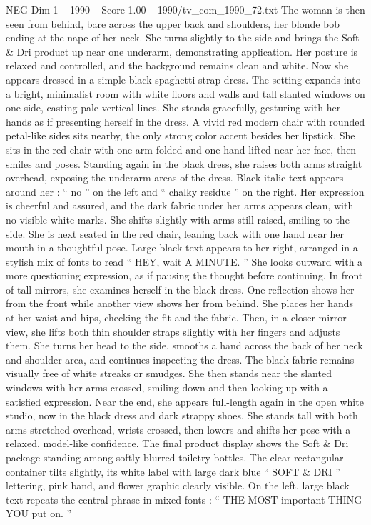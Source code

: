 \begin{textsample}{NEG Dim 1 – 1990 – Score 1.00 – 1990/tv\_com\_1990\_72.txt}
The woman is then seen from behind, bare across the upper back and shoulders, her blonde bob ending at the nape of her neck.
She turns slightly to the side and brings the Soft \& Dri product up near one underarm, demonstrating application.
Her posture is relaxed and controlled, and the background remains clean and white.
Now she appears dressed in a simple black spaghetti-strap dress.
The setting expands into a bright, minimalist room with white floors and walls and tall slanted windows on one side, casting pale vertical lines.
She stands gracefully, gesturing with her hands as if presenting herself in the dress.
A vivid red modern chair with rounded petal-like sides sits nearby, the only strong color accent besides her lipstick.
She sits in the red chair with one arm folded and one hand lifted near her face, then smiles and poses.
Standing again in the black dress, she raises both arms straight overhead, exposing the underarm areas of the dress.
Black italic text appears around her : “ no ” on the left and “ chalky residue ” on the right.
Her expression is cheerful and assured, and the dark fabric under her arms appears clean, with no visible white marks.
She shifts slightly with arms still raised, smiling to the side.
She is next seated in the red chair, leaning back with one hand near her mouth in a thoughtful pose.
Large black text appears to her right, arranged in a stylish mix of fonts to read “ HEY, wait A MINUTE. ” She looks outward with a more questioning expression, as if pausing the thought before continuing.
In front of tall mirrors, she examines herself in the black dress.
One reflection shows her from the front while another view shows her from behind.
She places her hands at her waist and hips, checking the fit and the fabric.
Then, in a closer mirror view, she lifts both thin shoulder straps slightly with her fingers and adjusts them.
She turns her head to the side, smooths a hand across the back of her neck and shoulder area, and continues inspecting the dress.
The black fabric remains visually free of white streaks or smudges.
She then stands near the slanted windows with her arms crossed, smiling down and then looking up with a satisfied expression.
Near the end, she appears full-length again in the open white studio, now in the black dress and dark strappy shoes.
She stands tall with both arms stretched overhead, wrists crossed, then lowers and shifts her pose with a relaxed, model-like confidence.
The final product display shows the Soft \& Dri package standing among softly blurred toiletry bottles.
The clear rectangular container tilts slightly, its white label with large dark blue “ SOFT \& DRI ” lettering, pink band, and flower graphic clearly visible.
On the left, large black text repeats the central phrase in mixed fonts : “ THE MOST important THING YOU put on. ”

\end{textsample}
